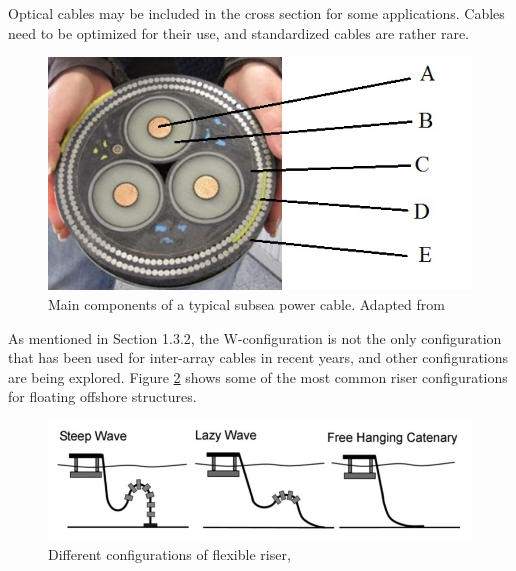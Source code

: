 \noindent Optical cables may be included in the cross section for some applications. Cables need to be optimized for their use, and standardized cables are rather rare. 


\begin{figure}[H]
\centering
\includegraphics[scale=0.8]{figures/pcable}
\caption[$\; \:$Main components of a typical subsea power cable]{Main components of a typical subsea power cable. Adapted from \cite{Boltinha2016} }
 \label{fig:pcable}
\end{figure}

\noindent As mentioned in Section 1.3.2, the W-configuration is not the only configuration that has been used for inter-array cables in recent years, and other configurations are being explored. Figure \ref{fig:config} shows some of the most common riser configurations for floating offshore structures. 

\begin{figure}[H]
\centering
\includegraphics[scale=0.8]{figures/config}
\caption[$\; \:$Different configurations of flexible riser]{Different configurations of flexible riser, \cite{Thies2012}}
 \label{fig:config}
\end{figure}

